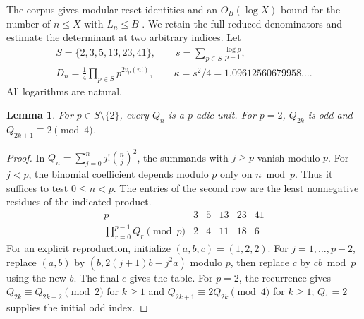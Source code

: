 \documentclass[11pt,a4paper,oneside,openany]{report}
\newtheorem{lemma}[theorem]{Lemma}\newtheorem{proposition}[theorem]{Proposition}
\theoremstyle{remark}\newtheorem{remark}[theorem]{Remark}
\numberwithin{equation}{section}
\begin{document}
The corpus gives modular reset identities \cite{vm33} and an
$O_B(\log X)$ bound for the number of $n\le X$ with $L_n\le B$
\cite{vm30}. We retain the full reduced denominators and estimate
the determinant at two arbitrary indices. Let
\[
 \begin{gathered}
 S=\{2,3,5,13,23,41\},\qquad
 s=\sum_{p\in S}\frac{\log p}{p-1},\\
 D_n=\tfrac14\prod_{p\in S}p^{2v_p(n!)},\qquad
 \kappa=s^2/4=1.09612560679958\ldots .
 \end{gathered}
\]
All logarithms are natural.

\begin{lemma}\label{ch1:lem:gomp-primes}
For $p\in S\setminus\{2\}$, every $Q_n$ is a $p$-adic unit.
For $p=2$, $Q_{2k}$ is odd and $Q_{2k+1}\equiv2\pmod4$.
\end{lemma}
\begin{proof}
In $Q_n=\sum_{j=0}^n j!\binom nj^2$, the summands with $j\ge p$
vanish modulo $p$. For $j<p$, the binomial coefficient depends
modulo $p$ only on $n\bmod p$. Thus it suffices to test $0\le n<p$.
The entries of the second row are the least nonnegative residues
of the indicated product.
\[
\begin{array}{c|rrrrr}
 p&3&5&13&23&41\\ \hline
 \prod_{r=0}^{p-1}Q_r\pmod p&2&4&11&18&6
\end{array}
\]
For an explicit reproduction, initialize $(a,b,c)=(1,2,2)$.
For $j=1,\ldots,p-2$, replace $(a,b)$ by
$(b,2(j+1)b-j^2a)$ modulo $p$, then replace $c$ by $cb\bmod p$
using the new $b$. The final $c$ gives the table.
For $p=2$, the recurrence gives $Q_{2k}\equiv Q_{2k-2}\pmod2$
for $k\ge1$ and $Q_{2k+1}\equiv2Q_{2k}\pmod4$ for $k\ge1$; $Q_1=2$ supplies the initial odd index.
\end{proof}
\end{document}
